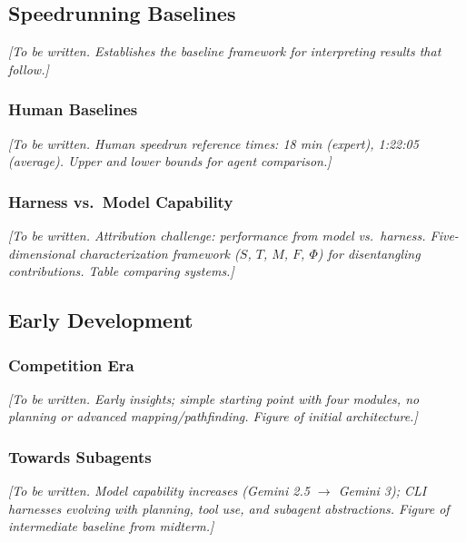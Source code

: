 \subsection{Speedrunning Baselines}\label{sec:baselines}

\textit{[To be written. Establishes the baseline framework for interpreting results that follow.]}

\subsubsection{Human Baselines}\label{sec:human_baselines}

\textit{[To be written. Human speedrun reference times: 18 min (expert), 1:22:05 (average). Upper and lower bounds for agent comparison.]}

\subsubsection{Harness vs.\ Model Capability}\label{sec:harness_vs_model}

\textit{[To be written. Attribution challenge: performance from model vs.\ harness. Five-dimensional characterization framework ($S$, $T$, $M$, $F$, $\Phi$) for disentangling contributions. Table comparing systems.]}

\subsection{Early Development}\label{sec:early_development}

\subsubsection{Competition Era}\label{sec:competition_era}

\textit{[To be written. Early insights; simple starting point with four modules, no planning or advanced mapping/pathfinding. Figure of initial architecture.]}

\subsubsection{Towards Subagents}\label{sec:towards_subagents}

\textit{[To be written. Model capability increases (Gemini 2.5 $\to$ Gemini 3); CLI harnesses evolving with planning, tool use, and subagent abstractions. Figure of intermediate baseline from midterm.]}

